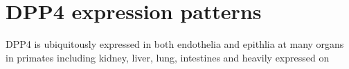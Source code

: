 \section{DPP4 expression patterns}
DPP4 is ubiquitously expressed in both endothelia and epithlia at many organs in primates including kidney, liver, lung, intestines and heavily expressed on 